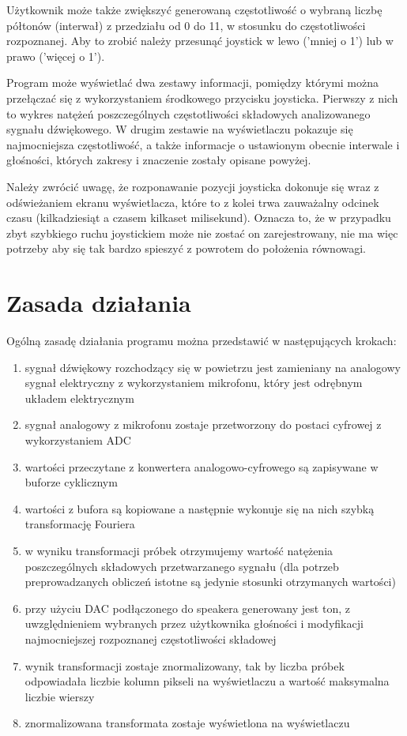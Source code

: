 \documentclass{article}
\begin{document}
Użytkownik może także zwiększyć generowaną częstotliwość o wybraną liczbę półtonów (interwał) z przedziału od 0 do 11, w stosunku do częstotliwości rozpoznanej. Aby to zrobić należy przesunąć joystick w lewo ('mniej o 1') lub w prawo ('więcej o 1').

Program może wyświetlać dwa zestawy informacji, pomiędzy którymi można przełączać się z wykorzystaniem środkowego przycisku joysticka. Pierwszy z nich to wykres natężeń poszczególnych częstotliwości składowych analizowanego sygnału dźwiękowego. W drugim zestawie na wyświetlaczu pokazuje się najmocniejsza częstotliwość, a także informacje o ustawionym obecnie interwale i głośności, których zakresy i znaczenie zostały opisane powyżej.

Należy zwrócić uwagę, że rozponawanie pozycji joysticka dokonuje się wraz z odświeżaniem ekranu wyświetlacza, które to z kolei trwa zauważalny odcinek czasu (kilkadziesiąt a czasem kilkaset milisekund). Oznacza to, że w przypadku zbyt szybkiego ruchu joystickiem może nie zostać on zarejestrowany, nie ma więc potrzeby aby się tak bardzo spieszyć z powrotem do położenia równowagi.

\section{Zasada działania}
Ogólną zasadę działania programu można przedstawić w następujących krokach:
\begin{enumerate}
    \item sygnał dźwiękowy rozchodzący się w powietrzu jest zamieniany na analogowy sygnał elektryczny z wykorzystaniem mikrofonu, który jest odrębnym układem elektrycznym
    \item sygnał analogowy z mikrofonu zostaje przetworzony do postaci cyfrowej z wykorzystaniem ADC
    \item wartości przeczytane z konwertera analogowo-cyfrowego są zapisywane w buforze cyklicznym
    \item wartości z bufora są kopiowane a następnie wykonuje się na nich szybką transformację Fouriera
    \item w wyniku transformacji próbek otrzymujemy wartość natężenia poszczególnych składowych przetwarzanego sygnału (dla potrzeb preprowadzanych obliczeń istotne są jedynie stosunki otrzymanych wartości)
    \item przy użyciu DAC podłączonego do speakera generowany jest ton, z uwzględnieniem wybranych przez użytkownika głośności i modyfikacji najmocniejszej rozpoznanej częstotliwości składowej
    \item wynik transformacji zostaje znormalizowany, tak by liczba próbek odpowiadała liczbie kolumn pikseli na wyświetlaczu a wartość maksymalna liczbie wierszy
    \item znormalizowana transformata zostaje wyświetlona na wyświetlaczu
\end{enumerate}
\end{document}
